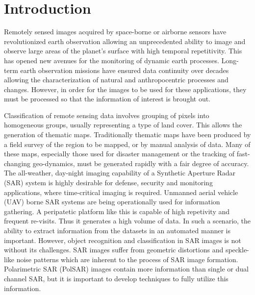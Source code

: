 \documentclass[12pt, a4paper]{article}
\begin{document}
\pagestyle{plain}
\def\title{Development of Auto-Encoder Based Methods for Synthetic Aperture Radar Image Analysis}
\def\degree{Doctor of Philosophy}
\def\who{Shaunak De (134316001)}
\def\guide{Prof. Avik Bhattacharya}
\def\when{15 February 2018}

\coverpage

\section{Introduction}

Remotely sensed images acquired by space-borne or airborne sensors have revolutionized earth observation allowing an unprecedented ability to image and observe large areas of the planet's surface with high temporal repetitivity. This has opened new avenues for the monitoring of dynamic earth processes. Long-term earth observation missions have ensured data continuity over decades allowing the characterization of natural and anthropocentric processes and changes. However, in order for the images to be used for these applications, they must be processed so that the information of interest is brought out. 

Classification of remote sensing data involves grouping of pixels into homogeneous groups, usually representing a type of land cover. This allows the generation of thematic maps. Traditionally thematic maps have been produced by a field survey of the region to be mapped, or by manual analysis of data. 
Many of these maps, especially those used for disaster management or the tracking of fast-changing geo-dynamics, must be generated rapidly with a fair degree of accuracy. 
The all-weather, day-night imaging capability of a Synthetic Aperture Radar (SAR) system is highly desirable for defense, security and monitoring applications, where time-critical imaging is required. Unmanned aerial vehicle (UAV) borne SAR systems are being operationally used for information gathering. A peripatetic platform like this is capable of high repetivity and frequent re-visits. Thus it generates a high volume of data. 
%
In such a scenario, the ability to extract information from the datasets in an automated manner is important. However, object recognition and classification in SAR images is not without its challenges. SAR images suffer from geometric distortions and speckle-like noise patterns which are inherent to the process of SAR image formation. Polarimetric SAR (PolSAR) images contain more information than single or dual channel SAR, but it is important to develop techniques to fully utilize this information.  
\end{document}
